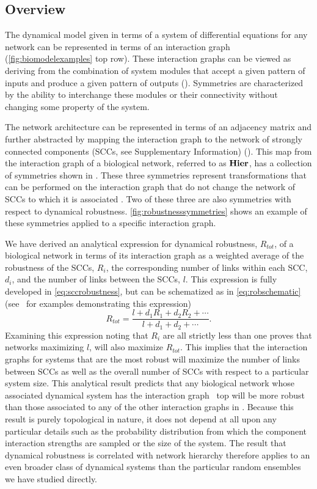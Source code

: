 \subsection{Overview}
The dynamical model given in terms of a system of differential equations for any network can be represented in terms of an interaction graph (\ref{fig:biomodelexamples} top row). These interaction graphs can be viewed as deriving from the combination of system modules that accept a given pattern of inputs and produce a given pattern of outputs (). Symmetries are characterized by the ability to interchange these modules or their connectivity without changing some property of the system.

The network architecture can be represented in terms of an adjacency matrix and further abstracted by mapping the interaction graph to the network of strongly connected components (SCCs, see Supplementary Information) (). This map from the interaction graph of a biological network, referred to as $\mathbf{Hier}$, has a collection of symmetries shown in . These three symmetries represent transformations that can be performed on the interaction graph that do not change the network of SCCs to which it is associated . Two of these three are also symmetries with respect to dynamical robustness. \ref{fig:robustnesssymmetries} shows an example of these symmetries applied to a specific interaction graph.

We have derived an analytical expression for dynamical robustness, $R_{tot}$, of a biological network in terms of its interaction graph as a weighted average of the robustness of the SCCs, $R_i$, the corresponding number of links within each SCC, $d_i$, and the number of links between the SCCs, $l$. This expression is fully developed in \ref{eq:sccrobustness}, but can be schematized as in \ref{eq:robschematic} (see $\,$ for examples demonstrating this expression)
\begin{equation}\label{eq:robschematic}
R_{tot} = \frac{l+d_1 R_1 + d_2 R_2 + \cdots}{l+d_1 + d_2 + \cdots}.
\end{equation}
Examining this expression noting that $R_i$ are all strictly less than one proves that networks maximizing $l$, will also maximize $R_{tot}$.
This implies that the interaction graphs for systems that are the most robust will maximize the number of links between SCCs as well as the overall number of SCCs with respect to a particular system size. This analytical result predicts that any biological network whose associated dynamical system has the interaction graph  $\,$ top will be more robust than those associated to any of the other interaction graphs in . Because this result is purely topological in nature, it does not depend at all upon any particular details such as the probability distribution from which the component interaction strengths are sampled or the size of the system. The result that dynamical robustness is correlated with network hierarchy therefore applies to an even broader class of dynamical systems than the particular random ensembles we have studied directly.

